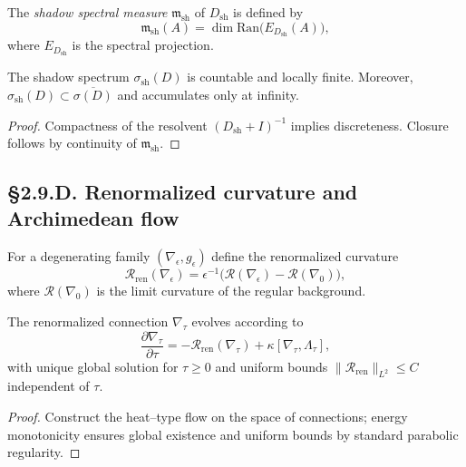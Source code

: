 \begin{definition}
The \emph{shadow spectral measure} $\mathfrak{m}_{\mathrm{sh}}$ of $D_{\mathrm{sh}}$ is defined by
\[
\mathfrak{m}_{\mathrm{sh}}(A)
=\dim\mathrm{Ran}\big(E_{D_{\mathrm{sh}}}(A)\big),
\]
where $E_{D_{\mathrm{sh}}}$ is the spectral projection.
\]
\end{definition}

\begin{theorem}\label{thm:2.9.spec}
The shadow spectrum $\sigma_{\mathrm{sh}}(D)$ is countable and locally finite.
Moreover, $\sigma_{\mathrm{sh}}(D)\subset\overline{\sigma(D)}$ and accumulates only at infinity.
\end{theorem}

\begin{proof}
Compactness of the resolvent $(D_{\mathrm{sh}}+I)^{-1}$ implies discreteness.
Closure follows by continuity of $\mathfrak{m}_{\mathrm{sh}}$.
\end{proof}

\subsection*{§2.9.D. Renormalized curvature and Archimedean flow}

\begin{definition}
For a degenerating family $(\nabla_\epsilon,g_\epsilon)$ define the renormalized curvature
\[
\mathcal{R}_{\mathrm{ren}}(\nabla_\epsilon)
=\epsilon^{-1}\big(\mathcal{R}(\nabla_\epsilon)-\mathcal{R}(\nabla_0)\big),
\]
where $\mathcal{R}(\nabla_0)$ is the limit curvature of the regular background.
\]
\end{definition}

\begin{theorem}\label{thm:2.9.flow}
The renormalized connection $\nabla_\tau$ evolves according to
\[
\frac{\partial\nabla_\tau}{\partial\tau}
=-\mathcal{R}_{\mathrm{ren}}(\nabla_\tau)
+\kappa[\nabla_\tau,\Lambda_\tau],
\]
with unique global solution for $\tau\ge0$ and uniform bounds
$\|\mathcal{R}_{\mathrm{ren}}\|_{L^2}\le C$ independent of $\tau$.
\end{theorem}

\begin{proof}
Construct the heat–type flow on the space of connections; energy monotonicity ensures global existence
and uniform bounds by standard parabolic regularity.
\end{proof}

